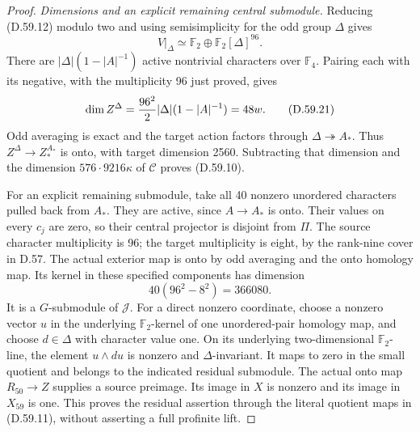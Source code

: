\begin{proof}
\emph{Dimensions and an explicit remaining central submodule.}
Reducing (D.59.12) modulo two and
using semisimplicity for the odd
group \(\Delta\) gives
\[
 V|_\Delta\simeq
           \mathbb F_2\oplus\mathbb F_2[\Delta]^{96}.
 \tag{D.59.20}
\]
There are
\(|\Delta|(1-|A|^{-1})\) active
nontrivial characters over
\(\mathbb F_4\). Pairing each with
its negative, with the multiplicity
96 just proved, gives
\[
 \dim Z^\Delta
       ={96^2\over2}|\Delta|(1-|A|^{-1})=48w.
 \tag{D.59.21}
\]
Odd averaging is exact and the
target action factors through
\(\Delta\twoheadrightarrow A_*\).
Thus \(Z^\Delta\to Z_*^{A_*}\)
is onto, with target dimension 2560.
Subtracting that dimension and the
dimension \(576\cdot9216\kappa\)
of \(\mathcal C\) proves (D.59.10).

For an explicit remaining submodule,
take all 40 nonzero unordered
characters pulled back from \(A_*\).
They are active, since \(A\to A_*\)
is onto. Their values on every
\(c_j\) are zero, so their central
projector is disjoint from \(\Pi\).
The source character multiplicity
is 96; the target multiplicity is
eight, by the rank-nine cover in
D.57. The actual exterior map is
onto by odd averaging and the
onto homology map. Its kernel in
these specified components has
dimension
\[
                   40(96^2-8^2)=366080.
 \tag{D.59.22}
\]
It is a \(G\)-submodule of
\(\mathcal J\). For a direct
nonzero coordinate, choose a
nonzero vector \(u\) in the
underlying \(\mathbb F_2\)-kernel
of one unordered-pair homology map, and
choose \(d\in\Delta\) with
character value one. On its
underlying two-dimensional
\(\mathbb F_2\)-line, the element
\(u\wedge du\) is nonzero and
\(\Delta\)-invariant. It maps
to zero in the small quotient
and belongs to the indicated
residual submodule. The actual
onto map \(R_{50}\to Z\) supplies
a source preimage. Its image in
\(X\) is nonzero and its image
in \(X_{59}\) is one. This proves
the residual assertion through
the literal quotient maps in
(D.59.11), without asserting a
full profinite lift.
\end{proof}
